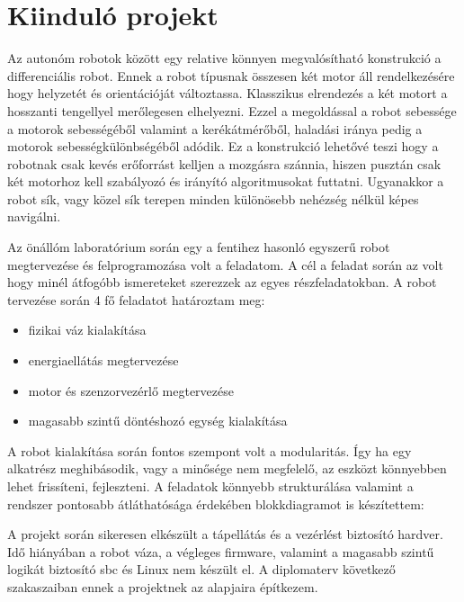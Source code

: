 \chapter{Kiinduló projekt}


Az autonóm robotok között egy relative könnyen megvalósítható konstrukció a differenciális robot. Ennek a robot típusnak összesen két motor áll rendelkezésére hogy helyzetét és orientációját változtassa.
Klasszikus elrendezés a két motort a hosszanti tengellyel merőlegesen elhelyezni. Ezzel a megoldással a robot sebessége a motorok sebességéből valamint a kerékátmérőből, haladási iránya pedig a motorok sebességkülönbségéből adódik.
Ez a konstrukció lehetővé teszi hogy a robotnak csak kevés erőforrást kelljen a mozgásra szánnia, hiszen pusztán csak két motorhoz kell szabályozó és irányító algoritmusokat futtatni. Ugyanakkor a robot sík, vagy közel sík terepen
minden különösebb nehézség nélkül képes navigálni.

Az önállóm laboratórium során egy a fentihez hasonló egyszerű robot megtervezése és felprogramozása volt a feladatom. A cél a feladat
során az volt hogy minél átfogóbb ismereteket szerezzek az egyes részfeladatokban. A robot tervezése során 4 fő feladatot határoztam meg:
\begin{itemize}
\item fizikai váz kialakítása
\item energiaellátás megtervezése
\item motor és szenzorvezérlő megtervezése
\item magasabb szintű döntéshozó egység kialakítása
\end{itemize}

A robot kialakítása során fontos szempont volt a modularitás. Így ha egy alkatrész meghibásodik, vagy a minősége nem megfelelő, az eszközt könnyebben lehet frissíteni, fejleszteni. A feladatok könnyebb strukturálása valamint a
rendszer pontosabb átláthatósága érdekében blokkdiagramot is készítettem:



A projekt során sikeresen elkészült a tápellátás és a vezérlést biztosító hardver. Idő hiányában a robot váza, a végleges firmware, valamint a magasabb szintű logikát biztosító sbc és Linux nem készült el. A diplomaterv következő
szakaszaiban ennek a projektnek az alapjaira építkezem.

